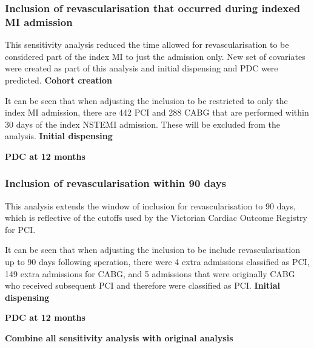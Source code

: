 \documentclass[11pt]{article}
\begin{document}
\subsubsection{Inclusion of revascularisation that occurred during indexed MI admission}
This sensitivity analysis reduced the time allowed for revascularisation to be considered part of the index MI to just the admission only. New set of covariates were created as part of this analysis and initial dispensing and PDC were predicted. 
\textbf{Cohort creation}
\color{violet}
\begin{stlog}\end{stlog}
\color{black}
It can be seen that when adjusting the inclusion to be restricted to only the index MI admission, there are 442 PCI and 288 CABG that are performed within 30 days of the index NSTEMI admission. These will be excluded from the analysis. 
\textbf{Initial dispensing}
\color{violet}
\begin{stlog}\end{stlog}
\color{black}
\textbf{PDC at 12 months}
\color{violet}
\begin{stlog}\end{stlog}
\color{black}
\subsubsection{Inclusion of revascularisation within 90 days}
This analysis extends the window of inclusion for revascularisation to 90 days, which is reflective of the cutoffs used by the Victorian Cardiac Outcome Registry for PCI. \cite{vcor2022}
\color{violet}
\begin{stlog}\end{stlog}
\color{black}
It can be seen that when adjusting the inclusion to be include revascularisation up to 90 days following speration, there were 4 extra admissions classified as PCI, 149 extra admissions for CABG, and 5 admissions that were originally CABG who received subsequent PCI and therefore were classified as PCI. 
\textbf{Initial dispensing}
\color{violet}
\begin{stlog}\end{stlog}
\color{black}
\textbf{PDC at 12 months}
\color{violet}
\begin{stlog}\end{stlog}
\color{black}
\textbf{Combine all sensitivity analysis with original analysis}
\color{violet}
\begin{stlog}\end{stlog}
\clearpage
\color{black}

\end{document}
